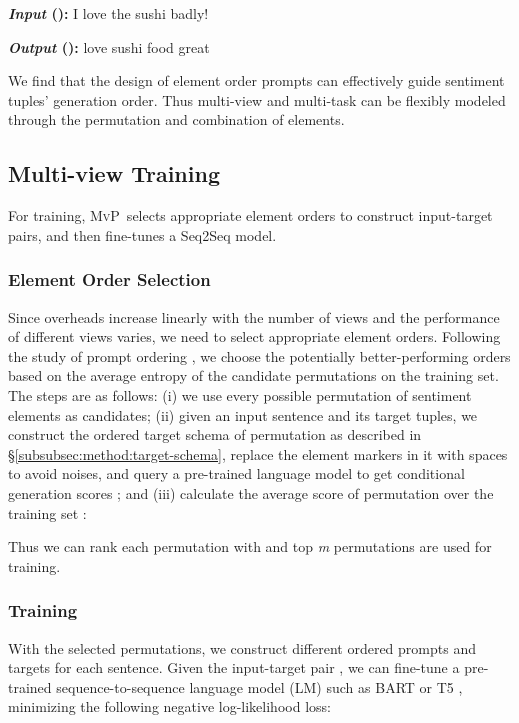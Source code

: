 \documentclass[11pt]{article}
\newcommand\mvp{\textsc{MvP}}
\begin{document}
\textbf{\emph{Input} ():} I love the sushi badly! 

\textbf{\emph{Output} ():}  love  sushi  food  great

We find that the design of element order prompts can effectively guide sentiment tuples' generation order. Thus multi-view and multi-task can be flexibly modeled through the permutation and combination of elements.


\subsection{Multi-view Training}
\label{subsec:method:mult-view-training}

For training, \mvp~selects appropriate element orders to construct input-target pairs, and then fine-tunes a Seq2Seq model.

\subsubsection{Element Order Selection}
\label{subsubsec:method:order-select}
Since overheads increase linearly with the number of views and the performance of different views varies, we need to select appropriate element orders.
Following the study of prompt ordering \cite{lu-etal-2022-fantastically, hu-etal-2022-improving-aspect}, we choose the potentially better-performing orders based on the average entropy of the candidate permutations on the training set. The steps are as follows:
(i) we use every possible permutation  of sentiment elements as candidates;
(ii) given an input sentence  and its target tuples, we construct the ordered target schema  of permutation  as described in \S \ref{subsubsec:method:target-schema}, replace the element markers in it with spaces to avoid noises, and query a pre-trained language model to get conditional generation scores ;
and (iii) calculate the average score of permutation  over the training set : 


Thus we can rank each permutation  with  and top \emph{m} permutations are used for training. 


\subsubsection{Training}
\label{subsubsec:method:training}
With the selected  permutations, we construct  different ordered prompts and targets for each sentence. Given the input-target pair , we can fine-tune a pre-trained sequence-to-sequence language model (LM) such as BART \cite{lewis-etal-2020-bart} or T5 \cite{DBLP:journals/jmlr/RaffelSRLNMZLL20}, minimizing the following negative log-likelihood loss:
\end{document}
